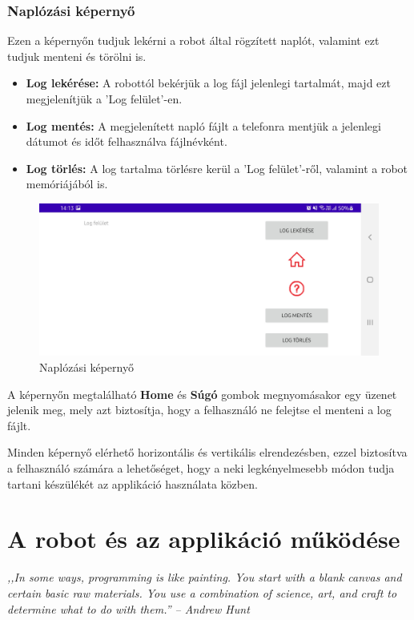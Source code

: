 \documentclass[]{thesis-ekf}
\theoremstyle{definition}
\begin{document}
\subsection{Naplózási képernyő}\label{log}
Ezen a képernyőn tudjuk lekérni a robot által rögzített naplót, valamint ezt tudjuk menteni és törölni is.
\begin{itemize}
	\item \textbf{Log lekérése:} A robottól bekérjük a log fájl jelenlegi tartalmát, majd ezt megjelenítjük a 'Log felület'-en.
	\item \textbf{Log mentés:} A megjelenített napló fájlt a telefonra mentjük a jelenlegi dátumot és időt felhasználva fájlnévként.
	\item \textbf{Log törlés:} A log tartalma törlésre kerül a 'Log felület'-ről, valamint a robot memóriájából is.
\end{itemize}
\begin{figure}[h]
	\centering
	\includegraphics[width=\columnwidth]{images/app_screen/log_screen}
	\caption{Naplózási képernyő}
	\label{log_screen}
\end{figure}

A képernyőn megtalálható \textbf{Home} és \textbf{Súgó} gombok megnyomásakor egy üzenet jelenik meg, mely azt biztosítja, hogy a felhasználó ne felejtse el menteni a log fájlt.

Minden képernyő elérhető horizontális és vertikális elrendezésben, ezzel biztosítva a felhasználó számára a lehetőséget, hogy a neki legkényelmesebb módon tudja tartani készülékét az applikáció használata közben.
\chapter{A robot és az applikáció működése}
\emph{,,In some ways, programming is like painting. You start with a blank canvas and certain basic raw materials. You use a combination of science, art, and craft to determine what to do with them.'' -- Andrew Hunt}
\end{document}
